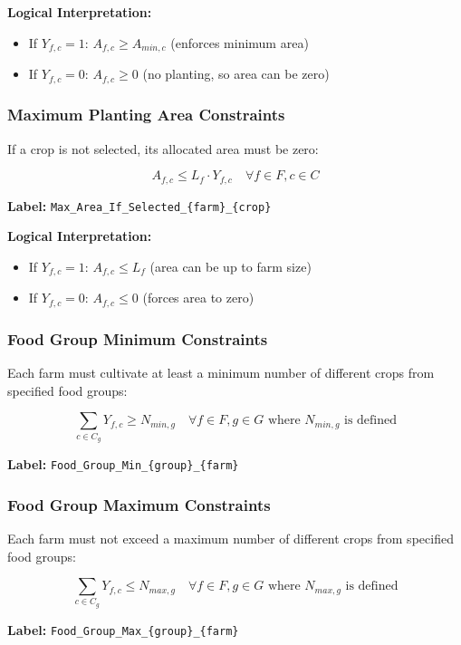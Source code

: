 \documentclass{article}
\begin{document}
\textbf{Logical Interpretation:}
\begin{itemize}
    \item If $Y_{f,c} = 1$: $A_{f,c} \geq A_{min,c}$ (enforces minimum area)
    \item If $Y_{f,c} = 0$: $A_{f,c} \geq 0$ (no planting, so area can be zero)
\end{itemize}

\subsubsection{Maximum Planting Area Constraints}

If a crop is not selected, its allocated area must be zero:

$$A_{f,c} \leq L_f \cdot Y_{f,c} \quad \forall f \in F, c \in C$$

\textbf{Label:} \texttt{Max\_Area\_If\_Selected\_\{farm\}\_\{crop\}}

\textbf{Logical Interpretation:}
\begin{itemize}
    \item If $Y_{f,c} = 1$: $A_{f,c} \leq L_f$ (area can be up to farm size)
    \item If $Y_{f,c} = 0$: $A_{f,c} \leq 0$ (forces area to zero)
\end{itemize}

\subsubsection{Food Group Minimum Constraints}

Each farm must cultivate at least a minimum number of different crops from specified food groups:

$$\sum_{c \in C_g} Y_{f,c} \geq N_{min,g} \quad \forall f \in F, g \in G \text{ where } N_{min,g} \text{ is defined}$$

\textbf{Label:} \texttt{Food\_Group\_Min\_\{group\}\_\{farm\}}

\subsubsection{Food Group Maximum Constraints}

Each farm must not exceed a maximum number of different crops from specified food groups:

$$\sum_{c \in C_g} Y_{f,c} \leq N_{max,g} \quad \forall f \in F, g \in G \text{ where } N_{max,g} \text{ is defined}$$

\textbf{Label:} \texttt{Food\_Group\_Max\_\{group\}\_\{farm\}}
\end{document}
